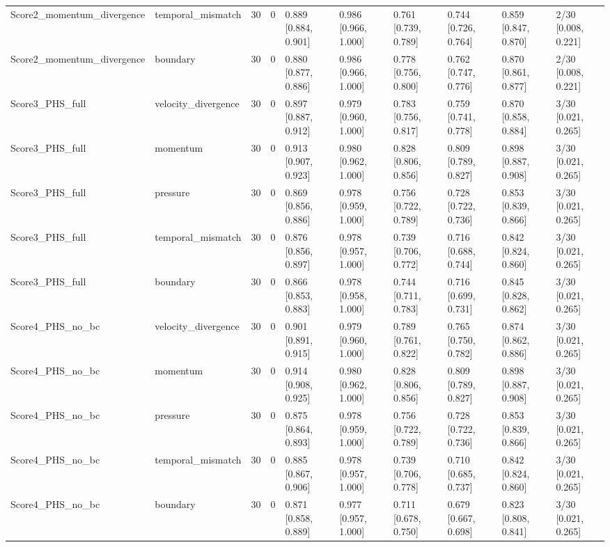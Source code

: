 \begin{table}
\begin{tabular}{llllllllll}
Score2\_momentum\_divergence & temporal\_mismatch & 30 & 0 & 0.889 [0.884, 0.901] & 0.986 [0.966, 1.000] & 0.761 [0.739, 0.789] & 0.744 [0.726, 0.764] & 0.859 [0.847, 0.870] & 2/30 [0.008, 0.221] \\
Score2\_momentum\_divergence & boundary & 30 & 0 & 0.880 [0.877, 0.886] & 0.986 [0.966, 1.000] & 0.778 [0.756, 0.800] & 0.762 [0.747, 0.776] & 0.870 [0.861, 0.877] & 2/30 [0.008, 0.221] \\
Score3\_PHS\_full & velocity\_divergence & 30 & 0 & 0.897 [0.887, 0.912] & 0.979 [0.960, 1.000] & 0.783 [0.756, 0.817] & 0.759 [0.741, 0.778] & 0.870 [0.858, 0.884] & 3/30 [0.021, 0.265] \\
Score3\_PHS\_full & momentum & 30 & 0 & 0.913 [0.907, 0.923] & 0.980 [0.962, 1.000] & 0.828 [0.806, 0.856] & 0.809 [0.789, 0.827] & 0.898 [0.887, 0.908] & 3/30 [0.021, 0.265] \\
Score3\_PHS\_full & pressure & 30 & 0 & 0.869 [0.856, 0.886] & 0.978 [0.959, 1.000] & 0.756 [0.722, 0.789] & 0.728 [0.722, 0.736] & 0.853 [0.839, 0.866] & 3/30 [0.021, 0.265] \\
Score3\_PHS\_full & temporal\_mismatch & 30 & 0 & 0.876 [0.856, 0.897] & 0.978 [0.957, 1.000] & 0.739 [0.706, 0.772] & 0.716 [0.688, 0.744] & 0.842 [0.824, 0.860] & 3/30 [0.021, 0.265] \\
Score3\_PHS\_full & boundary & 30 & 0 & 0.866 [0.853, 0.883] & 0.978 [0.958, 1.000] & 0.744 [0.711, 0.783] & 0.716 [0.699, 0.731] & 0.845 [0.828, 0.862] & 3/30 [0.021, 0.265] \\
Score4\_PHS\_no\_bc & velocity\_divergence & 30 & 0 & 0.901 [0.891, 0.915] & 0.979 [0.960, 1.000] & 0.789 [0.761, 0.822] & 0.765 [0.750, 0.782] & 0.874 [0.862, 0.886] & 3/30 [0.021, 0.265] \\
Score4\_PHS\_no\_bc & momentum & 30 & 0 & 0.914 [0.908, 0.925] & 0.980 [0.962, 1.000] & 0.828 [0.806, 0.856] & 0.809 [0.789, 0.827] & 0.898 [0.887, 0.908] & 3/30 [0.021, 0.265] \\
Score4\_PHS\_no\_bc & pressure & 30 & 0 & 0.875 [0.864, 0.893] & 0.978 [0.959, 1.000] & 0.756 [0.722, 0.789] & 0.728 [0.722, 0.736] & 0.853 [0.839, 0.866] & 3/30 [0.021, 0.265] \\
Score4\_PHS\_no\_bc & temporal\_mismatch & 30 & 0 & 0.885 [0.867, 0.906] & 0.978 [0.957, 1.000] & 0.739 [0.706, 0.778] & 0.710 [0.685, 0.737] & 0.842 [0.824, 0.860] & 3/30 [0.021, 0.265] \\
Score4\_PHS\_no\_bc & boundary & 30 & 0 & 0.871 [0.858, 0.889] & 0.977 [0.957, 1.000] & 0.711 [0.678, 0.750] & 0.679 [0.667, 0.698] & 0.823 [0.808, 0.841] & 3/30 [0.021, 0.265] \\

\end{tabular}
\end{table}
